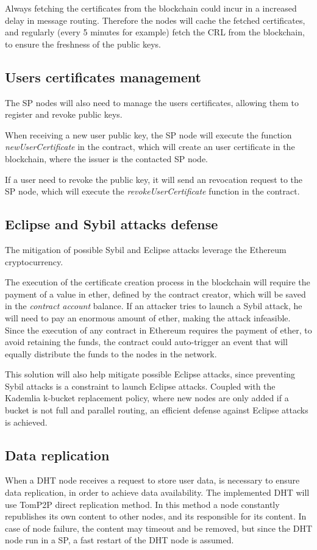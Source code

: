 Always fetching the certificates from the blockchain could incur in a increased delay in message routing.
Therefore the nodes will cache the fetched certificates, and regularly (every 5 minutes for example) fetch the CRL from the blockchain, to ensure the freshness of the public keys.

\subsection{Users certificates management}
The SP nodes will also need to manage the users certificates, allowing them to register and revoke public keys.

When receiving a new user public key, the SP node will execute the function \textit{newUserCertificate} in the contract, which will create an user certificate in the blockchain, where the issuer is the contacted SP node.

If a user need to revoke the public key, it will send an revocation request to the SP node, which will execute the \textit{revokeUserCertificate} function in the contract.

\subsection{Eclipse and Sybil attacks defense}
The mitigation of possible Sybil and Eclipse attacks leverage the Ethereum cryptocurrency.

The execution of the certificate creation process in the blockchain will require the payment of a value in ether, defined by the contract creator, which will be saved in the \textit{contract account} balance.
If an attacker tries to launch a Sybil attack, he will need to pay an enormous amount of ether, making the attack infeasible.
Since the execution of any contract in Ethereum requires the payment of ether, to avoid retaining the funds, the contract could auto-trigger an event that will equally distribute the funds to the nodes in the network.

This solution will also help mitigate possible Eclipse attacks, since preventing Sybil attacks is a constraint to launch Eclipse attacks.
Coupled with the Kademlia k-bucket replacement policy, where new nodes are only added if a bucket is not full and parallel routing, an efficient defense against Eclipse attacks is achieved.

\subsection{Data replication}
When a DHT node receives a request to store user data, is necessary to ensure data replication, in order to achieve data availability.
The implemented DHT will use TomP2P direct replication method. In this method a node constantly republishes its own content to other nodes, and its responsible for its content.
In case of node failure, the content may timeout and be removed, but since the DHT node run in a SP, a fast restart of the DHT node is assumed.
